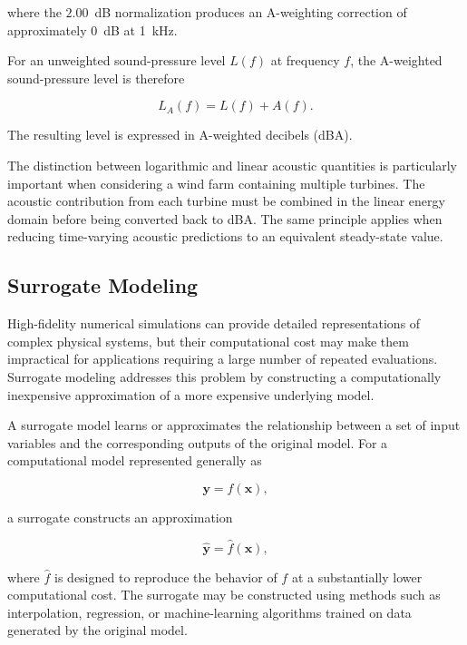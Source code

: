 \documentclass[11pt]{article}
\begin{document}
where the $2.00$~dB normalization produces an A-weighting correction of approximately 0~dB at 1~kHz.

For an unweighted sound-pressure level $L(f)$ at frequency $f$, the A-weighted sound-pressure level is therefore

\begin{equation}
    L_A(f)
    =
    L(f) + A(f).
\label{eq:dba-conversion}
\end{equation}

The resulting level is expressed in A-weighted decibels (dBA).

The distinction between logarithmic and linear acoustic quantities is particularly important when considering a wind farm containing multiple turbines. The acoustic contribution from each turbine must be combined in the linear energy domain before being converted back to dBA. The same principle applies when reducing time-varying acoustic predictions to an equivalent steady-state value.



\subsection{Surrogate Modeling}

High-fidelity numerical simulations can provide detailed representations of complex physical systems, but their computational cost may make them impractical for applications requiring a large number of repeated evaluations. Surrogate modeling addresses this problem by constructing a computationally inexpensive approximation of a more expensive underlying model.

A surrogate model learns or approximates the relationship between a set of input variables and the corresponding outputs of the original model. For a computational model represented generally as

\begin{equation}
    \mathbf{y} = f(\mathbf{x}),
\end{equation}

a surrogate constructs an approximation

\begin{equation}
    \hat{\mathbf{y}} = \hat{f}(\mathbf{x}),
\end{equation}

where $\hat{f}$ is designed to reproduce the behavior of $f$ at a substantially lower computational cost. The surrogate may be constructed using methods such as interpolation, regression, or machine-learning algorithms trained on data generated by the original model.
\end{document}
